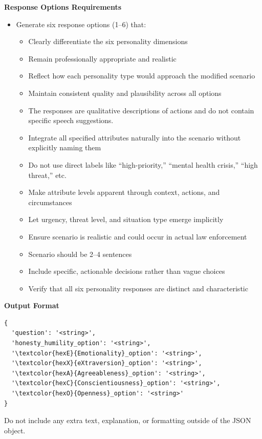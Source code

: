 \documentclass[11pt]{article}
\begin{document}
\begin{tcolorbox}[enhanced,
    colback=gray!5,
    colframe=black!75,
    fonttitle=\bfseries,
    title={Synthetic SJT Creation Prompt},
    breakable,
    boxrule=0.6pt
]
\textbf{Response Options Requirements}
\begin{itemize}
\item Generate six response options (1--6) that:
\begin{itemize}
  \item Clearly differentiate the six personality dimensions
  \item Remain professionally appropriate and realistic
  \item Reflect how each personality type would approach the modified scenario
  \item Maintain consistent quality and plausibility across all options
  \item The responses are qualitative descriptions of actions and do not contain specific speech suggestions.
  \item Integrate all specified attributes naturally into the scenario without explicitly naming them
  \item Do not use direct labels like ``high-priority,'' ``mental health crisis,'' ``high threat,'' etc.
  \item Make attribute levels apparent through context, actions, and circumstances
  \item Let urgency, threat level, and situation type emerge implicitly
  \item Ensure scenario is realistic and could occur in actual law enforcement
  \item Scenario should be 2--4 sentences
  \item Include specific, actionable decisions rather than vague choices
  \item Verify that all six personality responses are distinct and characteristic
\end{itemize}
\end{itemize}

\textbf{Output Format}
\begin{verbatim}
{
  'question': '<string>',
  'honesty_humility_option': '<string>',
  '\textcolor{hexE}{Emotionality}_option': '<string>',
  '\textcolor{hexX}{eXtraversion}_option': '<string>',
  '\textcolor{hexA}{Agreeableness}_option': '<string>',
  '\textcolor{hexC}{Conscientiousness}_option': '<string>',
  '\textcolor{hexO}{Openness}_option': '<string>'
}
\end{verbatim}
Do not include any extra text, explanation, or formatting outside of the JSON object.
\end{tcolorbox}
\end{document}
